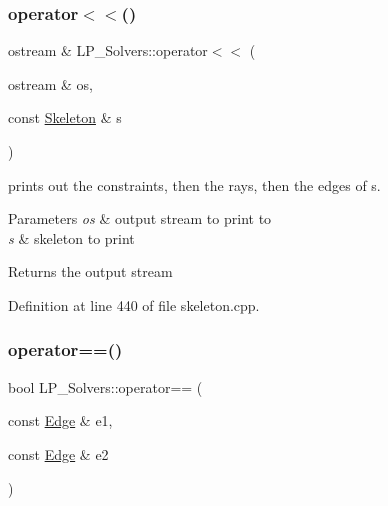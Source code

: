 \subsubsection{\texorpdfstring{operator$<$$<$()}{operator<<()}\hspace{0.1cm}{\footnotesize\ttfamily [4/4]}}
{\footnotesize\ttfamily ostream \& L\+P\+\_\+\+Solvers\+::operator$<$$<$ (\begin{DoxyParamCaption}\item[{ostream \&}]{os,  }\item[{const \hyperlink{group___c_l_s_solvers_class_l_p___solvers_1_1_skeleton}{Skeleton} \&}]{s }\end{DoxyParamCaption})}



prints out the constraints, then the rays, then the edges of {\ttfamily s}. 


\begin{DoxyParams}{Parameters}
{\em os} & output stream to print to \\
\hline
{\em s} & skeleton to print \\
\hline
\end{DoxyParams}
\begin{DoxyReturn}{Returns}
the output stream 
\end{DoxyReturn}


Definition at line 440 of file skeleton.\+cpp.

\mbox{\label{namespace_l_p___solvers_a4f4058fe5f5231e90bf5f864c8cc06f2}} 
\subsubsection{\texorpdfstring{operator==()}{operator==()}\hspace{0.1cm}{\footnotesize\ttfamily [1/3]}}
{\footnotesize\ttfamily bool L\+P\+\_\+\+Solvers\+::operator== (\begin{DoxyParamCaption}\item[{const \hyperlink{group___c_l_s_solvers_class_l_p___solvers_1_1_edge}{Edge} \&}]{e1,  }\item[{const \hyperlink{group___c_l_s_solvers_class_l_p___solvers_1_1_edge}{Edge} \&}]{e2 }\end{DoxyParamCaption})}



